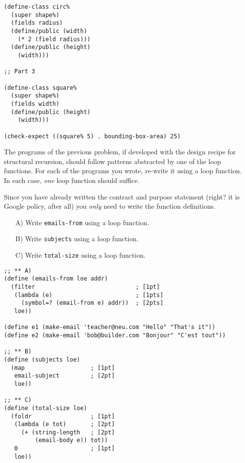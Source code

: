 \documentclass[12pt]{article}                   %
\def\pts#1{\marginpar{\footnotesize \raggedright  \fbox{#1 {\sc Points}}}}
\newenvironment{solution}{}{}
\begin{document}
\begin{problem}
\begin{solution}
\begin{verbatim}
(define-class circ% 
  (super shape%)
  (fields radius)
  (define/public (width)
    (* 2 (field radius)))
  (define/public (height)
    (width)))

;; Part 3
    
(define-class square%
  (super shape%)
  (fields width)
  (define/public (height)
    (width)))

(check-expect ((square% 5) . bounding-box-area) 25)
\end{verbatim}
\end{solution}

\newpage
\ifrubric{}
\newpage
\fi

\end{problem}

\begin{problem}\pts{13}
 
  The programs of the previous problem, if developed with the design
  recipe for structural recursion, should follow patterns abstracted
  by one of the loop functions.
  For each of the programs you wrote, re-write it using a loop function.
  In each case, \emph{one} loop function should suffice.

Since you have already written the contract and purpose statement
(right? it is Google policy, after all) you \textit{only} need to
write the function definitions.

\begin{itemize}
\item[A)\;] Write \texttt{emails-from} using a loop function.

\item[B)\;] Write \texttt{subjects} using a loop function.

\item[C)\;] Write \texttt{total-size} using a loop function.
\end{itemize}

\ifrubric\else
{}
\newpage
\fi

\begin{solution}
\begin{verbatim}
;; ** A)
(define (emails-from loe addr)
  (filter                             ; [1pt]
   (lambda (e)                        ; [1pts]
     (symbol=? (email-from e) addr))  ; [2pts]
   loe))

(define e1 (make-email 'teacher@neu.com "Hello" "That's it"))
(define e2 (make-email 'bob@builder.com "Bonjour" "C'est tout"))

;; ** B)
(define (subjects loe)
  (map                   ; [1pt]
   email-subject         ; [2pt]
   loe))

;; ** C)
(define (total-size loe)
  (foldr                 ; [1pt]
   (lambda (e tot)       ; [2pt]
     (+ (string-length   ; [2pt]
         (email-body e)) tot))
   0                     ; [1pt]
   loe))
\end{verbatim}
\end{solution}
\end{problem}
\end{document}
